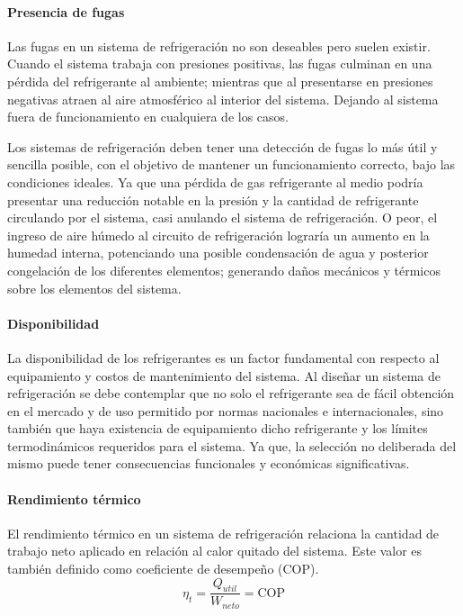 	\paragraph{Presencia de fugas} Las fugas en un sistema de refrigeración no son deseables pero suelen existir. Cuando el sistema trabaja con presiones positivas, las fugas culminan en una pérdida del refrigerante al ambiente; mientras que al presentarse en presiones negativas atraen al aire atmosférico al interior del sistema. Dejando al sistema fuera de funcionamiento en cualquiera de los casos.

	Los sistemas de refrigeración deben tener una detección de fugas lo más útil y sencilla posible, con el objetivo de mantener un funcionamiento correcto, bajo las condiciones ideales. Ya que una pérdida de gas refrigerante al medio podría presentar una reducción notable en la presión y la cantidad de refrigerante circulando por el sistema, casi anulando el sistema de refrigeración. O peor, el ingreso de aire húmedo al circuito de refrigeración lograría un aumento en la humedad interna, potenciando una posible condensación de agua y posterior congelación de los diferentes elementos; generando daños mecánicos y térmicos sobre los elementos del sistema. 

	\paragraph{Disponibilidad} La disponibilidad de los refrigerantes es un factor fundamental con respecto al equipamiento y costos de mantenimiento del sistema. Al diseñar un sistema de refrigeración se debe contemplar que no solo el refrigerante sea de fácil obtención en el mercado y de uso permitido por normas nacionales e internacionales, sino también que haya existencia de equipamiento dicho refrigerante y los límites termodinámicos requeridos para el sistema. Ya que, la selección no deliberada del mismo puede tener consecuencias funcionales y económicas significativas.  


	\paragraph{Rendimiento térmico} El rendimiento térmico en un sistema de refrigeración relaciona la cantidad de trabajo neto aplicado en relación al calor quitado del sistema. Este valor es también definido como coeficiente de desempeño (COP).
	\begin{equation*}
		\eta_{t} = \dfrac{Q_{util}}{W_{neto}} = \text{COP}
	\end{equation*} 
	
